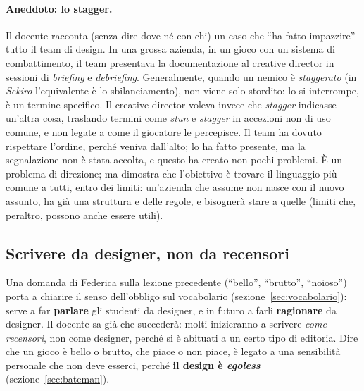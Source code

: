 \paragraph{Aneddoto: lo stagger.} Il docente racconta (senza dire dove né con
chi) un caso che ``ha fatto impazzire'' tutto il team di design. In una grossa
azienda, in un gioco con un sistema di combattimento, il team presentava la
documentazione al creative director in sessioni di \emph{briefing} e
\emph{debriefing}. Generalmente, quando un nemico è \emph{staggerato} (in
\emph{Sekiro} l'equivalente è lo sbilanciamento), non viene solo stordito: lo
si interrompe, è un termine specifico. Il creative director voleva invece che
\emph{stagger} indicasse un'altra cosa, traslando termini come \emph{stun} e
\emph{stagger} in accezioni non di uso comune, e non legate a come il
giocatore le percepisce. Il team ha dovuto rispettare l'ordine, perché veniva
dall'alto; lo ha fatto presente, ma la segnalazione non è stata accolta, e
questo ha creato non pochi problemi. È un problema di direzione; ma dimostra
che l'obiettivo è trovare il linguaggio più comune a tutti, entro dei limiti:
un'azienda che assume non nasce con il nuovo assunto, ha già una struttura e
delle regole, e bisognerà stare a quelle (limiti che, peraltro, possono anche
essere utili).

\subsection{Scrivere da designer, non da recensori}

Una domanda di Federica sulla lezione precedente (``bello'', ``brutto'',
``noioso'') porta a chiarire il senso dell'obbligo sul vocabolario
(sezione~\ref{sec:vocabolario}): serve a far \textbf{parlare} gli studenti da
designer, e in futuro a farli \textbf{ragionare} da designer. Il docente sa
già che succederà: molti inizieranno a scrivere \emph{come recensori}, non
come designer, perché si è abituati a un certo tipo di editoria. Dire che un
gioco è bello o brutto, che piace o non piace, è legato a una sensibilità
personale che non deve esserci, perché \textbf{il design è \emph{egoless}}
(sezione~\ref{sec:bateman}).

